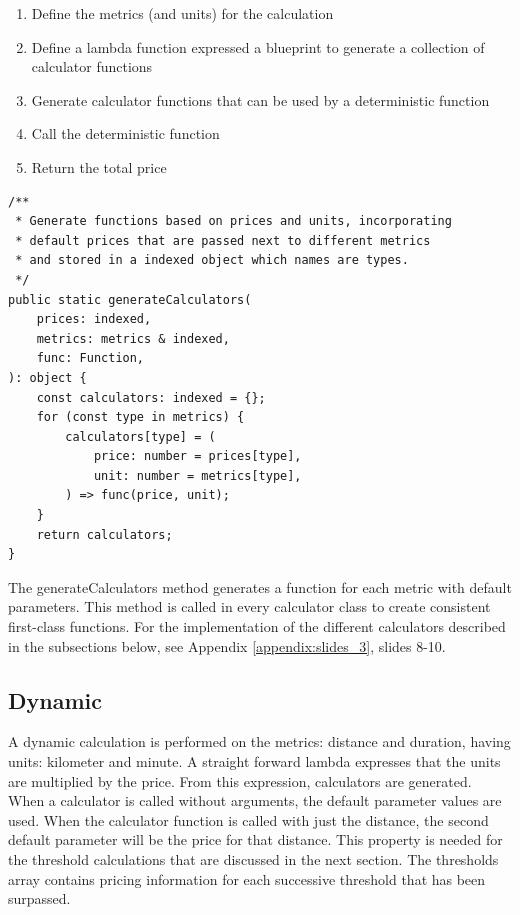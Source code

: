 \begin{enumerate}
	\item Define the metrics (and units) for the calculation
	\item Define a lambda function expressed a blueprint to generate a collection of calculator functions
	\item Generate calculator functions that can be used by a deterministic function
	\item Call the deterministic function
	\item Return the total price
\end{enumerate}

\begin{center}
\noindent\begin{minipage}{.85\textwidth}
\begin{lstlisting}[caption={Calculator generator.}, label={lst:calculator-generator}]
/**
 * Generate functions based on prices and units, incorporating
 * default prices that are passed next to different metrics
 * and stored in a indexed object which names are types.
 */
public static generateCalculators(
	prices: indexed,
	metrics: metrics & indexed,
	func: Function,
): object {
	const calculators: indexed = {};
	for (const type in metrics) {
		calculators[type] = (
			price: number = prices[type],
			unit: number = metrics[type],
		) => func(price, unit);
	}
	return calculators;
}
\end{lstlisting}
\end{minipage}
\end{center}

The generateCalculators method generates a function for each metric with default parameters. This method is called in every calculator class to create consistent first-class functions. For the implementation of the different calculators described in the subsections below, see Appendix \ref{appendix:slides_3}, slides 8-10.

\subsection{Dynamic}
A dynamic calculation is performed on the metrics: distance and duration, having units: kilometer and minute. A straight forward lambda expresses that the units are multiplied by the price. From this expression, calculators are generated. When a calculator is called without arguments, the default parameter values are used. When the calculator function is called with just the distance, the second default parameter will be the price for that distance. This property is needed for the threshold calculations that are discussed in the next section. The thresholds array contains pricing information for each successive threshold that has been surpassed.

